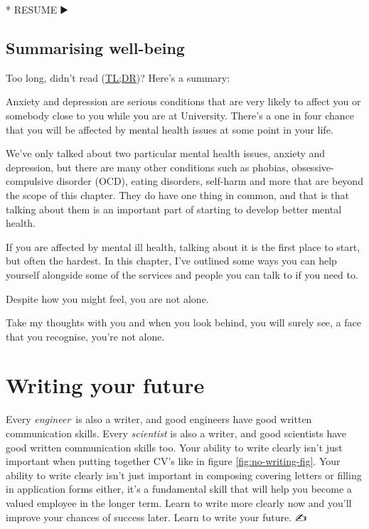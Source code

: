 \documentclass[
]{book}
\newenvironment{Shaded}{\begin{snugshade}}{\end{snugshade}}
\newcommand{\NormalTok}[1]{#1}
\newcommand{\SpecialStringTok}[1]{\textcolor[rgb]{0.31,0.60,0.02}{#1}}
\begin{document}
\begin{Shaded}
\begin{Highlighting}[]
\SpecialStringTok{* }\NormalTok{RESUME ▶️}
\end{Highlighting}
\end{Shaded}

\hypertarget{tldr3}{%
\section{Summarising well-being}\label{tldr3}}

Too long, didn't read (\href{https://en.wiktionary.org/wiki/too_long;_didn\%27t_read}{TL;DR})? Here's a summary:

Anxiety and depression are serious conditions that are very likely to affect you or somebody close to you while you are at University. There's a one in four chance that you will be affected by mental health issues at some point in your life.

We've only talked about two particular mental health issues, anxiety and depression, but there are many other conditions such as phobias, obsessive-compulsive disorder (OCD), eating disorders, self-harm and more that are beyond the scope of this chapter. They do have one thing in common, and that is that talking about them is an important part of starting to develop better mental health.

If you are affected by mental ill health, talking about it is the first place to start, but often the hardest. In this chapter, I've outlined some ways you can help yourself alongside some of the services and people you can talk to if you need to.

Despite how you might feel, you are not alone.

Take my thoughts with you and when you look behind, you will surely see, a face that you recognise, you're not alone. \citep{yourenotalone}

\hypertarget{writing}{%
\chapter{Writing your future}\label{writing}}

Every \emph{engineer}~is also a writer, and good engineers have good written communication skills. Every \emph{scientist} is also a writer, and good scientists have good written communication skills too. Your ability to write clearly isn't just important when putting together CV's like in figure \ref{fig:no-writing-fig}. Your ability to write clearly isn't just important in composing covering letters or filling in application forms either, it's a fundamental skill that will help you become a valued employee in the longer term. Learn to write more clearly now and you'll improve your chances of success later. Learn to write your future. ✍️
\end{document}
